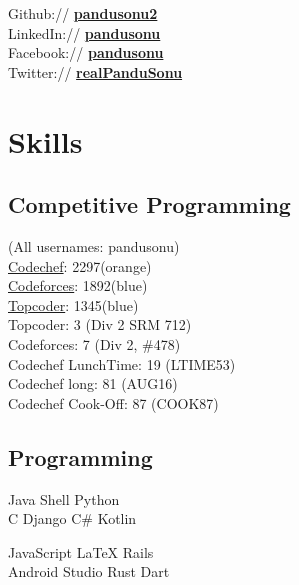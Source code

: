 \documentclass[letterpaper]{deedy-resume} %
\begin{document}
\begin{minipage}[t]{0.33\textwidth}
Github:// \href{https://github.com/pandusonu2}{\bf pandusonu2} \\
LinkedIn:// \href{https://www.linkedin.com/in/pandusonu}{\bf pandusonu} \\
Facebook:// \href{https://www.facebook.com/pandu.sonu}{\bf pandusonu} \\
Twitter:// \href{https://twitter.com/realPanduSonu} {\bf realPanduSonu}

\sectionspace %

\section{Skills}

\sectionspace

\subsection{Competitive Programming}
(All usernames: pandusonu) \\
\href{https://www.codechef.com/users/pandusonu}{Codechef}: 2297(orange)\\
\href{http://codeforces.com/profile/pandusonu}{Codeforces}: 1892(blue) \\
\href{https://www.topcoder.com/members/pandusonu/}{Topcoder}: 1345(blue)\\
Topcoder: 3 (Div 2 SRM 712)\\
Codeforces: 7 (Div 2, \#478)\\
Codechef LunchTime: 19 (LTIME53)\\
Codechef long: 81 (AUG16)\\
Codechef Cook-Off: 87 (COOK87)

\sectionspace

\subsection{Programming}

Java \textbullet{} Shell \textbullet{} Python \textbullet{} \\
C \textbullet{} Django \textbullet{} C\# \textbullet{} Kotlin

JavaScript \textbullet{} \LaTeX \textbullet{} Rails \textbullet{} \\
Android Studio \textbullet{} Rust \textbullet{} Dart




\end{minipage} %
\end{document}
